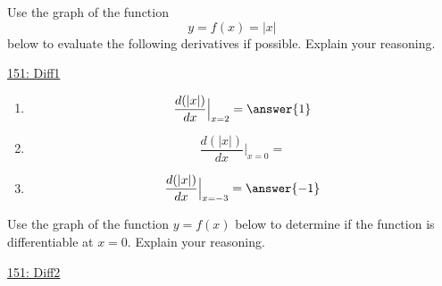 \documentclass{ximera}
\begin{document}
\begin{exploration}  \label{Exp9485rf5r}

Use the graph of the function 
\[
    y = f(x) = |x|
\]
below to evaluate the following derivatives if possible. Explain your reasoning.

\begin{onlineOnly}
    \begin{center}
\end{center}
\end{onlineOnly}

\href{https://www.desmos.com/calculator/us2fruzbra}{151: Diff1}

\begin{enumerate}
\item 
\[
 \frac{d (|x|)}{dx}\Big|_{x=2} = \answer{1}
\]

\item 
\[
 \frac{d (|x|)}{dx}\Big|_{x=0} = 
\]

\item 
\[
 \frac{d (|x|)}{dx}\Big|_{x=-3} = \answer{-1}
\]
\end{enumerate}
\end{exploration}


\begin{exploration} \label{Exp4kfgk4g4}
Use the graph of the function $y=f(x)$ below to determine if the function is differentiable at $x=0$. Explain your reasoning.

\begin{onlineOnly}
    \begin{center}
\end{center}
\end{onlineOnly}

\href{https://www.desmos.com/calculator/ov8qt938ot}{151: Diff2}


\end{exploration}
\end{document}

